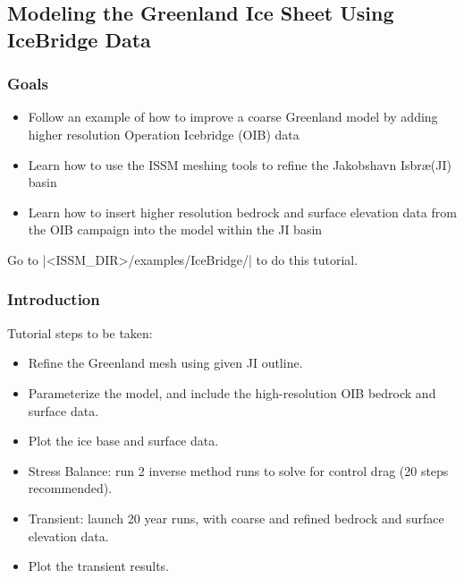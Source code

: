 
\subsection{Modeling the Greenland Ice Sheet Using IceBridge Data} \label{sec:using-issm-tutorials-icebridge}
\subsubsection{Goals} %
\begin{itemize}
	\item Follow an example of how to improve a coarse Greenland model by adding higher resolution Operation Icebridge (OIB) data
	\item Learn how to use the ISSM meshing tools to refine the Jakobshavn Isbr\ae (JI) basin
	\item Learn how to insert higher resolution bedrock and surface elevation data from the OIB campaign into the model within the JI basin
\end{itemize}

Go to \lstinlinebg|<ISSM_DIR>/examples/IceBridge/| to do this tutorial.

\subsubsection{Introduction}%
Tutorial steps to be taken:
\begin{itemize}
	\item Refine the Greenland mesh using given JI outline.
	\item Parameterize the model, and include the high-resolution OIB bedrock and surface data.
	\item Plot the ice base and surface data.
	\item Stress Balance: run 2 inverse method runs to solve for control drag (20 steps recommended).
	\item Transient: launch 20 year runs, with coarse and refined bedrock and surface elevation data.
	\item Plot the transient results.
\end{itemize}

